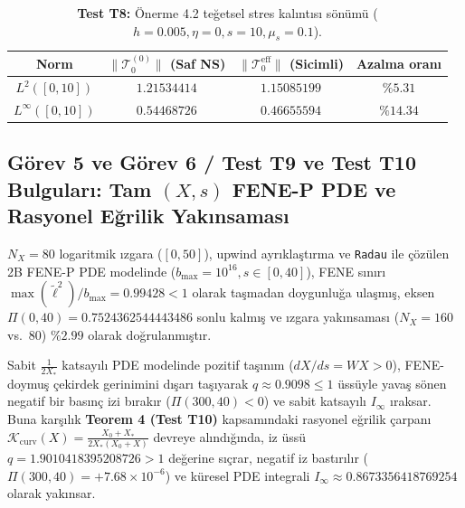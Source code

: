 \documentclass[12pt,a4paper]{article}
\begin{document}
\begin{table}[htbp]
\centering
\footnotesize
\caption{\textbf{Test T8:} Önerme 4.2 teğetsel stres kalıntısı sönümü ($h=0.005, \eta=0, s=10, \mu_s=0.1$).}
\vspace{0.1cm}
\begin{tabular}{c|cc|c}
\hline
Norm & $\|\mathcal{T}_0^{(0)}\|$ (Saf NS) & $\|\mathcal{T}_0^{\mathrm{eff}}\|$ (Sicimli) & Azalma oranı \\
\hline
$L^2([0,10])$ & $1.21534414$ & $1.15085199$ & $\%5.31$ \\
$L^\infty([0,10])$ & $0.54468726$ & $0.46655594$ & $\%14.34$ \\
\hline
\end{tabular}
\end{table}

\subsection{Görev 5 ve Görev 6 / Test T9 ve Test T10 Bulguları: Tam $(X,s)$ FENE-P PDE ve Rasyonel Eğrilik Yakınsaması}

$N_X = 80$ logaritmik ızgara ($[0, 50]$), upwind ayrıklaştırma ve \texttt{Radau} ile çözülen 2B FENE-P PDE modelinde ($b_{\max} = 10^{16}, s \in [0, 40]$), FENE sınırı $\max(\tilde{\ell}^2)/b_{\max} = 0.99428 < 1$ olarak taşmadan doygunluğa ulaşmış, eksen $\Pi(0, 40) = 0.7524362544443486$ sonlu kalmış ve ızgara yakınsaması ($N_X=160$ vs.\ $80$) $\%2.99$ olarak doğrulanmıştır.

Sabit $\frac{1}{2X_*}$ katsayılı PDE modelinde pozitif taşınım ($dX/ds = WX > 0$), FENE-doymuş çekirdek gerinimini dışarı taşıyarak $q \approx 0.9098 \le 1$ üssüyle yavaş sönen negatif bir basınç izi bırakır ($\Pi(300, 40) < 0$) ve sabit katsayılı $I_\infty$ ıraksar. Buna karşılık \textbf{Teorem 4 (Test T10)} kapsamındaki rasyonel eğrilik çarpanı $\mathcal{K}_{\mathrm{curv}}(X) = \frac{X_0+X_*}{2X_*(X_0+X)}$ devreye alındığında, iz üssü $q = 1.9010418395208726 > 1$ değerine sıçrar, negatif iz bastırılır ($\Pi(300, 40) = +7.68 \times 10^{-6}$) ve küresel PDE integrali $I_\infty \approx 0.8673356418769254$ olarak yakınsar.
\end{document}
